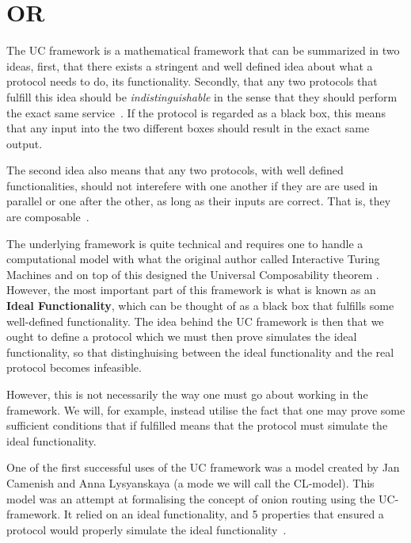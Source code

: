 \section{ \acl*{OR}}%
\label{UCOR}
The \ac{UC} framework is a mathematical framework that can be summarized in
two ideas, first, that there exists a stringent and well defined idea
about what a protocol needs to do, its functionality. Secondly, that
any two protocols that fulfill this idea should be {\it
  indistinguishable\/} in the sense that they should perform the exact
same service~\cite{UniversalComposability}. If the protocol is regarded as a black box, this means
that any input into the two different boxes should result in the
exact same output.

The second idea also means that any two protocols, with well defined
functionalities, should not interefere with one another if they are
are used in parallel or one after the other, as long as their inputs
are correct. That is, they are composable~\cite{UniversalComposability}.

The underlying framework is quite technical and requires one to handle
a computational model with what the original author %
called Interactive Turing Machines and on top of this designed the
Universal Composability theorem \cite{UniversalComposability}. However, the most important part of
this framework is what is known as an {\bf Ideal Functionality}, which
can be thought of as a black box that fulfills some well-defined
functionality\cite{UniversalComposability}. The idea behind the \ac{UC} framework is then that we ought
to define a protocol which we must then prove simulates the ideal
functionality, so that distinghuising between the ideal functionality
and the real protocol becomes infeasible.

However, this is not necessarily the way one must go about working in
the framework. We will, for example, instead utilise the fact that one
may prove some sufficient conditions that if fulfilled means that the
protocol must simulate the ideal functionality.

One of the first successful uses of the \ac{UC} framework was a model
created by Jan Camenish and Anna Lysyanskaya (a mode we will call the
CL-model). This model was an attempt at formalising the concept of
onion routing using the UC-framework. It relied on an ideal
functionality, and 5 properties that ensured a protocol would properly
simulate the ideal functionality~\cite{CL-model}.


